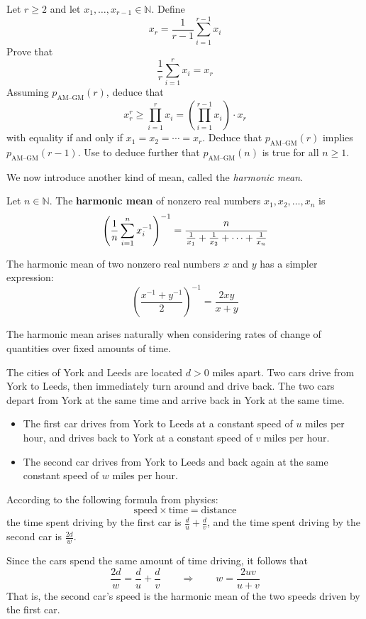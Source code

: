 \begin{exercise}
\label{exAMGMForPredecessors}
Let $r \ge 2$ and let $x_1,\dots,x_{r-1} \in \mathbb{N}$. Define
\[ x_r = \frac{1}{r-1} \sum_{i=1}^{r-1} x_i \]
Prove that
\[ \frac{1}{r}\sum_{i=1}^r x_i = x_r \]
Assuming $p_{\text{AM--GM}}(r)$, deduce that
\[ x_r^r \ge \prod_{i=1}^r x_i = \left(\prod_{i=1}^{r-1} x_i\right) \cdot x_r \]
with equality if and only if $x_1=x_2=\cdots=x_r$. Deduce that $p_{\text{AM--GM}}(r)$ implies $p_{\text{AM--GM}}(r-1)$. Use  to deduce further that $p_{\text{AM--GM}}(n)$ is true for all $n \ge 1$.
\end{exercise}

We now introduce another kind of mean, called the \textit{harmonic mean}.

\begin{definition}
\label{defHarmonicMean}
Let $n \in \mathbb{N}$. The \textbf{harmonic mean} of nonzero real numbers $x_1,x_2,\dots,x_n$ is
\[ \left( \frac{1}{n} \sum_{i=1}^n x_i^{-1} \right)^{-1} = \cfrac{n}{\frac{1}{x_1} + \frac{1}{x_2} + \cdots + \frac{1}{x_n}} \]
\end{definition}

The harmonic mean of two nonzero real numbers $x$ and $y$ has a simpler expression:
\[ \left( \frac{x^{-1}+y^{-1}}{2} \right)^{-1} = \frac{2xy}{x+y} \]

The harmonic mean arises naturally when considering rates of change of quantities over fixed amounts of time.

\begin{example}
The cities of York and Leeds are located $d>0$ miles apart. Two cars drive from York to Leeds, then immediately turn around and drive back. The two cars depart from York at the same time and arrive back in York at the same time.
\begin{itemize}
\item The first car drives from York to Leeds at a constant speed of $u$ miles per hour, and drives back to York at a constant speed of $v$ miles per hour.
\item The second car drives from York to Leeds and back again at the same constant speed of $w$ miles per hour.
\end{itemize}
According to the following formula from physics:
\[ \text{speed} \times \text{time} = \text{distance} \]
the time spent driving by the first car is $\frac{d}{u} + \frac{d}{v}$, and the time spent driving by the second car is $\frac{2d}{w}$.

Since the cars spend the same amount of time driving, it follows that
\[ \frac{2d}{w} = \frac{d}{u} + \frac{d}{v} \qquad \Rightarrow \qquad w = \frac{2uv}{u+v} \]
That is, the second car's speed is the harmonic mean of the two speeds driven by the first car.
\end{example}

